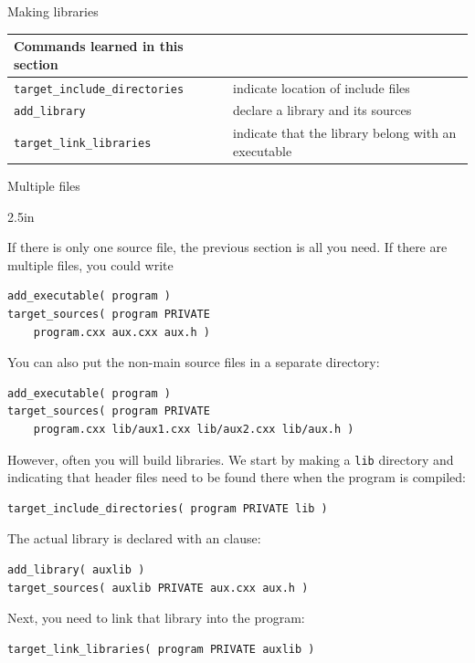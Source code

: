 \newpage
{} {Making libraries}

\begin{tabular}{lp{3in}}
  \toprule
  Commands learned in this section\\
  \midrule
  \lstinline+target_include_directories+&indicate location of include files\\
  \lstinline+add_library+&declare a library and its sources\\
  \lstinline+target_link_libraries+&indicate that the library belong with an executable\\
  \bottomrule
\end{tabular}

 {Multiple files}


\begin{floatingfigure}[r]{2.5in}
  \begin{minipage}{2.5in}
  \end{minipage}
\end{floatingfigure}
%
If there is only one source file, the previous section is all you need.
If there are multiple files, you could write
\begin{lstlisting}
add_executable( program )
target_sources( program PRIVATE 
    program.cxx aux.cxx aux.h )
\end{lstlisting}
You can also put the non-main source files in a separate directory:
\begin{lstlisting}
add_executable( program )
target_sources( program PRIVATE
    program.cxx lib/aux1.cxx lib/aux2.cxx lib/aux.h )
\end{lstlisting}
%
However, often you will build libraries.
We start by making a \lstinline[language=shell]{lib} directory
and indicating that header files need to be found there
when the program is compiled:
\begin{lstlisting}
target_include_directories( program PRIVATE lib )
\end{lstlisting}
%
The actual library is declared with an  clause:
\begin{lstlisting}
add_library( auxlib )
target_sources( auxlib PRIVATE aux.cxx aux.h )
\end{lstlisting}
Next, you need to link that library into the program:
\begin{lstlisting}
target_link_libraries( program PRIVATE auxlib )
\end{lstlisting}


